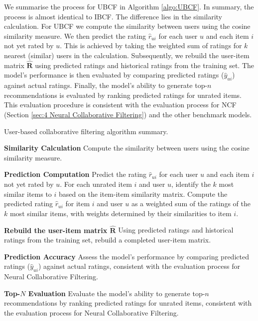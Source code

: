 We summarise the process for UBCF in Algorithm \ref{algo:UBCF}. In summary, the process is almost identical to IBCF. The difference lies in the similarity calculation. For UBCF we compute the similarity between users using the cosine similarity measure. We then predict the rating $\hat{r}_{u i}$ for each user $u$ and each item $i$ not yet rated by $u$. This is achieved by taking the weighted sum of ratings for $k$ nearest (similar) users in the calculation. Subsequently, we rebuild the user-item matrix $\hat{\mathbf{R}}$ using predicted ratings and historical ratings from the training set. The model's performance is then evaluated by comparing predicted ratings ($\hat{y}_{u i}$) against actual ratings. Finally, the model's ability to generate top-$n$ recommendations is evaluated by ranking predicted ratings for unrated items. This evaluation procedure is consistent with the evaluation process for NCF (Section \ref{sec:4 Neural Collaborative Filtering}) and the other benchmark models.

\begin{algorithm}
    \caption{User-based collaborative filtering algorithm summary.}
    \label{algo:UBCF}
    \begin{algorithmic}[1]
      \State \textbf{Similarity Calculation}
      \newline \quad Compute the similarity between users using the cosine similarity measure.
    
    \State \textbf{Prediction Computation}
    \newline \quad Predict the rating \(\hat{r}_{ui}\) for each user \(u\) and each item \(i\) not yet rated by \(u\).
    \newline \quad For each unrated item \(i\) and user \(u\), identify the \(k\) most similar items to \(i\) based on the item-item similarity matrix.
    \newline \quad Compute the predicted rating \(\hat{r}_{ui}\) for item \(i\) and user \(u\) as a weighted sum of the ratings of the \(k\) most similar items, with weights determined by their similarities to item \(i\).
    
      \State \textbf{Rebuild the user-item matrix $\hat{\mathbf{R}}$}
      \newline \quad Using predicted ratings and historical ratings from the training set, rebuild a completed user-item matrix.
    
      \State \textbf{Prediction Accuracy}
      \newline \quad Assess the model's performance by comparing predicted ratings ($\hat{y}_{u i}$) against actual ratings, consistent with the evaluation process for Neural Collaborative Filtering.
    
      \State \textbf{Top-$N$ Evaluation}
      \newline \quad Evaluate the model's ability to generate top-$n$ recommendations by ranking predicted ratings for unrated items, consistent with the evaluation process for Neural Collaborative Filtering.
    \end{algorithmic}
    \end{algorithm}

